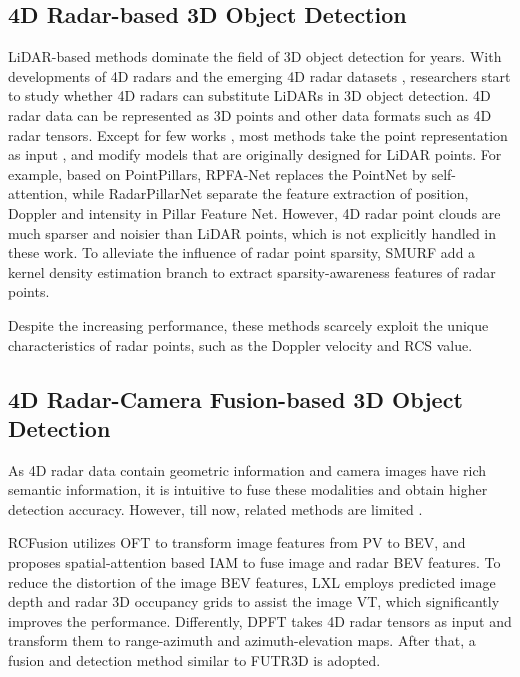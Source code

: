 \vspace{-3mm}
\subsection{4D Radar-based 3D Object Detection}

LiDAR-based methods dominate the field of 
3D object detection for years. With developments of 4D radars and the emerging 4D radar datasets \cite{VoD, TJ4DRadSet, K-Radar}, researchers start to study whether 4D radars can substitute LiDARs in 3D object detection. 
%
4D radar data can be represented as 3D points and other data formats such as 4D radar tensors. Except for few works \cite{K-Radar,RTNH+}, most methods take the point representation as input \cite{RPFA-Net,SMURF,RadarMFNet}, and modify models that are originally designed for LiDAR points. For example, based on PointPillars\cite{PointPillars}, RPFA-Net\cite{RPFA-Net} replaces the PointNet \cite{PointNet} by self-attention, while RadarPillarNet\cite{RCFusion} separate the feature extraction of position, Doppler and intensity in Pillar Feature Net. However, 4D radar point clouds are much sparser and noisier than LiDAR points, which is not explicitly handled in these work. To alleviate the influence of radar point sparsity, SMURF\cite{SMURF} add a kernel density estimation branch to extract sparsity-awareness features of radar points. 

Despite the increasing performance, these methods scarcely exploit the unique characteristics of radar points, such as the Doppler velocity and RCS value. 

\vspace{-3mm}
\subsection{4D Radar-Camera Fusion-based 3D Object Detection}

As 4D radar data contain geometric information and camera images have rich semantic information, it is intuitive to fuse these modalities and obtain higher detection accuracy. However, till now,  related methods are limited \cite{RCFusion,LXL,DPFT}.

RCFusion \cite{RCFusion} utilizes OFT\cite{OFT} to transform image features from PV to BEV, and proposes spatial-attention based IAM to fuse image and radar BEV features. To reduce the distortion of the image BEV features, LXL\cite{LXL} employs predicted image depth and radar 3D occupancy grids to assist the image VT, which significantly improves the performance. Differently, DPFT\cite{DPFT} takes 4D radar tensors as input and transform them to range-azimuth and azimuth-elevation maps. After that, a fusion and detection method similar to FUTR3D\cite{FUTR3D} is adopted.

